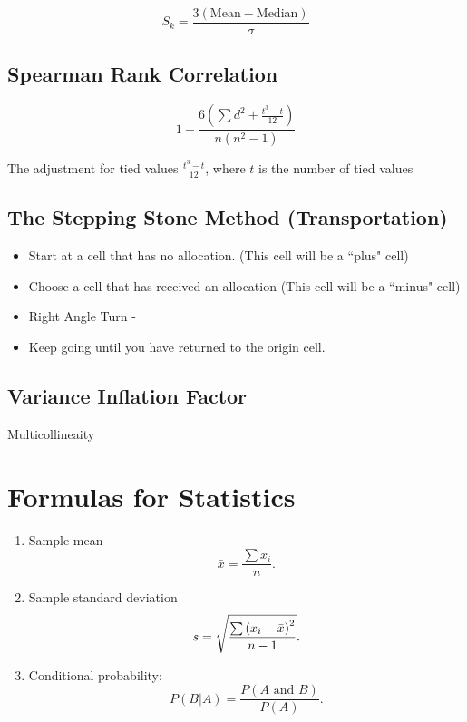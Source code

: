 \[S_k = \frac{3(\mbox{Mean} - \mbox{Median} )}{\sigma} \]




\section{Spearman Rank Correlation}

\[ 1 - \frac{6\left( \sum d^2 + \frac{t^3-t}{12} \right)}{n(n^2-1)} \]

The adjustment for tied values
$ \frac{t^3-t}{12} $, where $t$ is the number of tied values


\section{The Stepping Stone Method (Transportation)}

\begin{itemize}
	\item Start at a cell that has no allocation. (This cell will be a ``plus" cell)
	\item Choose a cell that has received an allocation (This cell will be a ``minus" cell)
	\item Right Angle Turn -
	\item Keep going until you have returned to the origin cell.
\end{itemize}

\section{Variance Inflation Factor}

Multicollineaity

\chapter{Formulas for Statistics}

\begin{enumerate}
	\item Sample mean
	\begin{equation*}
	\bar{x}=\frac{\sum x_{i}}{n}.
	\end{equation*}
	
	\item Sample standard deviation
	\begin{equation*}
	s=\sqrt{\frac{\sum \left( x_{i}-\bar{x}\right) ^{2}}{%
			n-1}}.
	\end{equation*}
	
	\item Conditional probability:
	\begin{equation*}
	P(B|A)=\frac{P\left( A\text{ and }B\right) }{P\left( A\right) }.
	\end{equation*}
\end{enumerate}	

